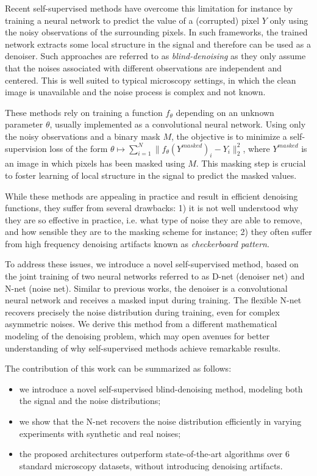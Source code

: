 \documentclass{article}
\begin{document}
Recent self-supervised methods have overcome this limitation \cite{batson2019noise2self,krull2018noise2void,quan2020self} for instance by training a neural network to predict the value of a (corrupted) pixel $Y$ only using the noisy observations of the surrounding pixels. In such frameworks, the trained network extracts some local structure in the signal and therefore can be used as a denoiser. Such approaches are referred to as \textit{blind-denoising} as they only assume that the noises associated with different observations are independent and centered.
This is well suited to typical microscopy settings, in which the clean image is unavailable and the noise process is complex and not known.

These methods rely on training a function $f_\theta$ depending on an unknown parameter $\theta$, usually implemented as a convolutional neural network. Using only the noisy observations and a binary mask $M$, the objective is to minimize a self-supervision loss of the form $\theta\mapsto \sum_{i=1}^N \|f_\theta(Y^{masked})_i - Y_i\|_2^2$,
where $Y^{masked}$ is an image in which pixels has been masked using $M$. This masking step is crucial to foster learning of local structure in the signal to predict the masked values.

While these methods are appealing in practice and result in efficient denoising functions, they suffer from several drawbacks:
1) it is not well understood why they are so effective in practice, i.e. what type of noise they are able to remove, and how sensible they are to the masking scheme for instance;
2) they often suffer from high frequency denoising artifacts known as \textit{checkerboard pattern}.

To address these issues, we introduce a novel self-supervised method, based on the joint training of two neural networks referred to as D-net (denoiser net) and N-net (noise net). Similar to previous works, the denoiser is a convolutional neural network and receives a masked input during training. The flexible N-net recovers precisely the noise distribution during training, even for complex asymmetric noises.
We derive this method from a different mathematical modeling of the denoising problem, which may open avenues for better understanding of why self-supervised methods achieve remarkable results.

The contribution of this work can be summarized as follows:
\begin{itemize}
\item we introduce a novel self-supervised blind-denoising method, modeling both the signal and the noise distributions;
\item we show that the N-net recovers the noise distribution efficiently in varying experiments with synthetic and real noises;
\item the proposed architectures outperform state-of-the-art algorithms over 6 standard microscopy datasets, without introducing denoising artifacts.
\end{itemize}
\end{document}

